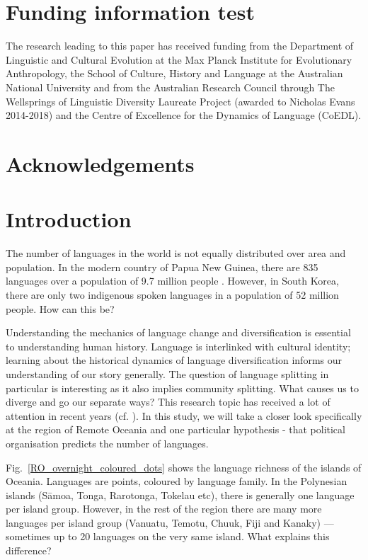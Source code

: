 \documentclass[unnumsec,webpdf,modern,medium]{oup-authoring-template}
\begin{document}


\section*{Funding information test}
The research leading to this paper has received funding from the Department of Linguistic and Cultural Evolution at the Max Planck Institute for Evolutionary Anthropology, the School of Culture, History and Language at the Australian National University and from the Australian Research Council through The Wellsprings of Linguistic Diversity Laureate Project (awarded to Nicholas Evans 2014-2018) and the Centre of Excellence for the Dynamics of Language (CoEDL).

\section*{Acknowledgements}



\newpage

\onecolumn
\section{Introduction}
\doublespacing

The number of languages in the world is not equally distributed over area and population. In the modern country of Papua New Guinea, there are 835 languages over a population of 9.7 million people \citep{UN_pop, glottolog3}. However, in South Korea, there are only two indigenous spoken languages in a population of 52 million people. How can this be?

Understanding the mechanics of language change and diversification is essential to understanding human history. Language is interlinked with cultural identity; learning about the historical dynamics of language diversification informs our understanding of our story generally. The question of language splitting in particular is interesting as it also implies community splitting. What causes us to diverge and go our separate ways? This research topic has received a lot of attention in recent years (cf. \citet{gavin2017process,  greenhill2015demographic, Pacheco_Coelho_2019, hua2019ecological}). In this study, we will take a closer look specifically at the region of Remote Oceania and one particular hypothesis - that political organisation predicts the number of languages.

Fig.~\ref{RO_overnight_coloured_dots} shows the language richness of the islands of Oceania. Languages are points, coloured by language family. In the Polynesian islands (S\={a}moa, Tonga, Rarotonga, Tokelau etc), there is generally one language per island group. However, in the rest of the region there are many more languages per island group (Vanuatu, Temotu, Chuuk, Fiji and Kanaky) --- sometimes up to 20 languages on the very same island. What explains this difference?
\end{document}
